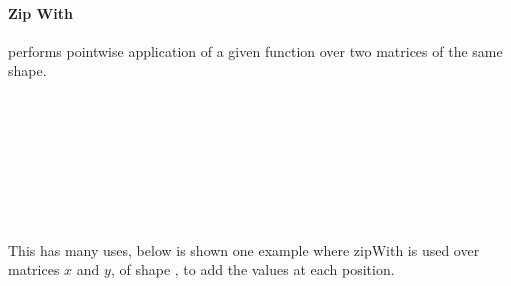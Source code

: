 \paragraph{Zip With}\label{para:zipWith} performs pointwise application of a 
given function  over two matrices of the same shape. 
\begin{code}[hide]%
\>[0]\AgdaSpace{}%
\AgdaSpace{}%
\<%
\\
\>[0][@{}l@{\AgdaIndent{0}}]%
\>[2]\AgdaSpace{}%
\AgdaSpace{}%
\AgdaSpace{}%
\AgdaSpace{}%
\AgdaSymbol{(}\AgdaSymbol{;}\AgdaSpace{}%
\AgdaSymbol{;}\AgdaSpace{}%
\AgdaSymbol{;}\AgdaSpace{}%
\AgdaSymbol{)}\<%
\\
%
\>[2]\<%
\\
\>[2][@{}l@{\AgdaIndent{0}}]%
\>[4]\<%
\\
\>[4][@{}l@{\AgdaIndent{0}}]%
\>[6]\AgdaSpace{}%
\AgdaSpace{}%
\AgdaSpace{}%
\AgdaSymbol{:}\AgdaSpace{}%
\<%
\\
%
\>[6]\AgdaSpace{}%
\AgdaSpace{}%
\AgdaSymbol{:}\AgdaSpace{}%
\<%
\end{code}
\begin{code}%
%
\>[2]\AgdaSpace{}%
\AgdaSymbol{:}\AgdaSpace{}%
\AgdaSymbol{(}\AgdaSpace{}%
\AgdaSpace{}%
\AgdaSpace{}%
\AgdaSpace{}%
\AgdaSymbol{)}\AgdaSpace{}%
\AgdaSpace{}%
\AgdaSpace{}%
\AgdaSpace{}%
\AgdaSpace{}%
\AgdaSpace{}%
\AgdaSpace{}%
\AgdaSpace{}%
\AgdaSpace{}%
\AgdaSpace{}%
\AgdaSpace{}%
\AgdaSpace{}%
\<%
\\
%
\>[2]\AgdaSpace{}%
\AgdaSpace{}%
\AgdaSpace{}%
\AgdaSpace{}%
\AgdaSpace{}%
\AgdaSymbol{=}\AgdaSpace{}%
\AgdaSpace{}%
\AgdaSymbol{(}\AgdaSpace{}%
\AgdaSymbol{)}\AgdaSpace{}%
\AgdaSymbol{(}\AgdaSpace{}%
\AgdaSymbol{)}\<%
\end{code}
This has many uses, below is shown one example where zipWith is used
over matrices $x$ and $y$, of shape ,
to add the values at each position.

